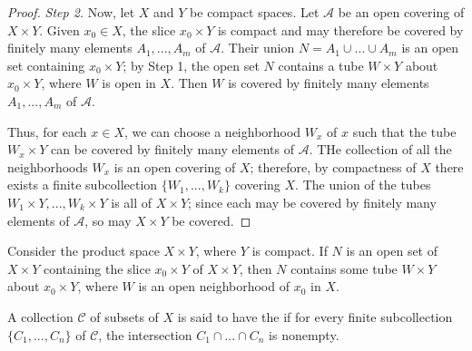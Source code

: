 \documentclass[12pt, a4paper, oneside, openright, titlepage]{book}
\begin{document}
\begin{proof}
    \emph{Step 2.} Now, let $X$ and $Y$ be compact spaces. Let $\mathcal{A}$ be an open covering of $X\times Y$. Given $x_0 \in X$, the slice $x_0 \times Y$ is compact and may therefore be covered by finitely many elements $A_1,...,A_m$ of $\mathcal{A}$. Their union $N = A_1 \cup ... \cup A_m$ is an open set containing $x_0 \times Y$; by Step 1, the open set $N$ contains a tube $W\times Y$ about $x_0 \times Y$, where $W$ is open in $X$. Then $W$ is covered by finitely many elements $A_1,...,A_m$ of $\mathcal{A}$. 

    Thus, for each $x \in X$, we can choose a neighborhood $W_x$ of $x$ such that the tube $W_x \times Y$ can be covered by finitely many elements of $\mathcal{A}$. THe collection of all the neighborhoods $W_x$ is an open covering of $X$; therefore, by compactness of $X$ there exists a finite subcollection $\{W_1,...,W_k\}$ covering $X$. The union of the tubes $W_1\times Y,..., W_k\times Y$ is all of $X \times Y$; since each may be covered by finitely many elements of $\mathcal{A}$, so may $X\times Y$ be covered.
\end{proof}

\begin{lem}
    Consider the product space $X\times Y$, where $Y$ is compact. If $N$ is an open set of $X\times Y$ containing the slice $x_0 \times Y$ of $X\times Y$, then $N$ contains some tube $W\times Y$ about $x_0 \times Y$, where $W$ is an open neighborhood of $x_0$ in $X$.
\end{lem}

\begin{defn}
    A collection $\mathcal{C}$ of subsets of $X$ is said to have the  if for every finite subcollection $\{C_1,...,C_n\}$ of $\mathcal{C}$, the intersection $C_1\cap ...\cap C_n$ is nonempty.
\end{defn}
\end{document}

